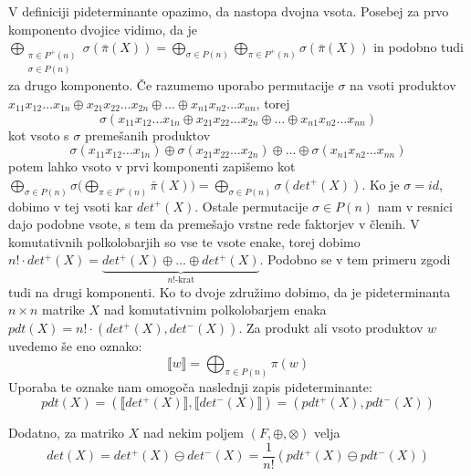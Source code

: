 \documentclass[mat1]{fmfdelo}
\begin{document}
V definiciji pideterminante opazimo, da nastopa dvojna vsota. Posebej za prvo komponento dvojice vidimo, da je $\bigoplus_{\substack{\pi\in P^{+}(n) \\ \sigma\in P(n)}}\sigma(\bar{\pi}(X)) = \bigoplus_{\sigma \in P(n)} \bigoplus_{\pi\in P^{+}(n)}\sigma(\bar{\pi}(X))$ in podobno tudi za drugo komponento. Če razumemo uporabo permutacije $\sigma$ na vsoti produktov $x_{11}x_{12}\ldots x_{1n} \oplus x_{21}x_{22}\ldots x_{2n} \oplus \ldots \oplus x_{n1}x_{n2}\ldots x_{nn}$, torej $$\sigma(x_{11}x_{12}\ldots x_{1n} \oplus x_{21}x_{22}\ldots x_{2n} \oplus \ldots \oplus x_{n1}x_{n2}\ldots x_{nn})$$ kot vsoto s $\sigma$ premešanih produktov $$\sigma(x_{11}x_{12}\ldots x_{1n}) \oplus \sigma(x_{21}x_{22}\ldots x_{2n}) \oplus \ldots \oplus \sigma(x_{n1}x_{n2}\ldots x_{nn})$$ potem lahko vsoto v prvi komponenti zapišemo kot $\bigoplus_{\sigma \in P(n)}\sigma\big(\bigoplus_{\pi\in P^{+}(n)}\bar{\pi}(X)\big) = \bigoplus_{\sigma \in P(n)}\sigma(det^{+}(X))$. Ko je $\sigma = id$, dobimo v tej vsoti kar $det^{+}(X)$. Ostale permutacije $\sigma\in P(n)$ nam v resnici dajo podobne vsote, s tem da premešajo vrstne rede faktorjev v členih. 
V komutativnih polkolobarjih so vse te vsote enake, torej dobimo $n!\cdot det^{+}(X) = \underbrace{det^{+}(X) \oplus \ldots \oplus det^{+}(X)}_{\text{$n!$-krat}}$. Podobno se v tem primeru zgodi tudi na drugi komponenti. Ko to dvoje združimo dobimo, da je pideterminanta $n\times n$ matrike $X$ nad komutativnim polkolobarjem enaka $pdt(X) = n!\cdot (det^{+}(X), det^{-}(X))$. 
Za produkt ali vsoto produktov $w$ uvedemo še eno oznako: $$\llbracket w \rrbracket = \bigoplus_{\pi\in P(n)}\pi(w)$$ Uporaba te oznake nam omogoča naslednji zapis pideterminante: $$pdt(X) = (\llbracket det^{+}(X) \rrbracket, \llbracket det^{-}(X) \rrbracket) = (pdt^{+}(X), pdt^{-}(X))$$

Dodatno, za matriko $X$ nad nekim poljem $(F, \oplus, \otimes)$ velja $$det(X) = det^{+}(X) \ominus det^{-}(X) = \frac{1}{n!}(pdt^{+}(X) \ominus pdt^{-}(X))$$
\end{document}
